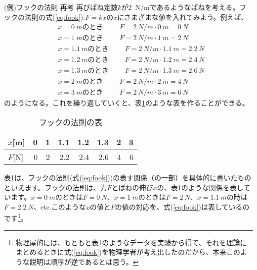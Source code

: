 \documentclass[uplatex,dvipdfmx]{jsarticle}
\begin{document}
	\begin{itembox}[l]{(例)フックの法則 再考}
		再びばね定数$k$が\SI{2}{N/m}であるようなばねを考える。フックの法則の式(\ref{eq:fook}):$F=kx$の$x$にさまざまな値を入れてみよう。例えば、
		\begin{align*}
			&x=\SI{0}{m}のとき \hspace{1cm} F = \SI{2}{N/m}\cdot \SI{0}{m} = \SI{0}{N} \\
			&x=\SI{1}{m}のとき \hspace{1cm} F = \SI{2}{N/m}\cdot \SI{1}{m} = \SI{2}{N} \\
			&x=\SI{1.1}{m}のとき \hspace{1cm} F = \SI{2}{N/m}\cdot \SI{1.1}{m} = \SI{2.2}{N} \\
			&x=\SI{1.2}{m}のとき \hspace{1cm} F = \SI{2}{N/m}\cdot \SI{1.2}{m} = \SI{2.4}{N} \\
			&x=\SI{1.3}{m}のとき \hspace{1cm} F = \SI{2}{N/m}\cdot \SI{1.3}{m} = \SI{2.6}{N} \\
			&x=\SI{2}{m}のとき \hspace{1cm} F = \SI{2}{N/m}\cdot \SI{2}{m} = \SI{4}{N} \\
			&x=\SI{3}{m}のとき \hspace{1cm} F = \SI{2}{N/m}\cdot \SI{3}{m} = \SI{6}{N}
		\end{align*}
		のようになる。これを繰り返していくと、表\ref{tab:fook}のような表を作ることができる。
	\end{itembox}

	\begin{table}[htbp]
		\caption{フックの法則の表}
		\label{tab:fook}
		\centering
		\begin{tabular}{l||rrrrrrr}
			\hline
			$x$[m] & 0 & 1 & 1.1 & 1.2 & 1.3 & 2 & 3 \\ 
			\hline
			$F$[N] & 0 & 2 & 2.2 & 2.4 & 2.6 & 4 & 6 \\
			\hline
		\end{tabular}			
	\end{table}		

	表\ref{tab:fook}は、フックの法則(式(\ref{eq:fook}))の表す関係（の一部）を具体的に書いたものといえます。フックの法則は、力$F$とばねの伸び$x$の、表\ref{tab:fook}のような関係を表しています。$x=\SI{0}{m}$のときは$F=\SI{0}{N}$、$x=\SI{1}{m}$のときは$F=\SI{2}{N}$、$x=\SI{1.1}{m}$の時は$F=\SI{2.2}{N}$、etc.このような$x$の値と$F$の値の対応を、式(\ref{eq:fook})は表しているのです\footnote{物理屋的には、もともと表\ref{tab:fook}のようなデータを実験から得て、それを理論にまとめるときに式(\ref{eq:fook})を物理学者が考え出したのだから、本来このような説明は順序が逆であるとは思う。}。
	
\end{document}
